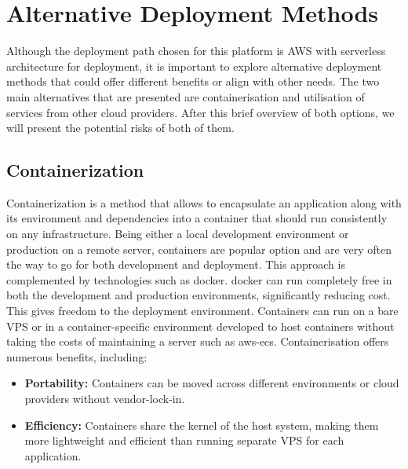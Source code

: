 \section{Alternative Deployment Methods}
\label{sec:alternative-deployment-methods}

Although the deployment path chosen for this platform is \ac{AWS} with serverless architecture for deployment, it is important to explore alternative deployment methods that could offer different benefits or align with other needs.
The two main alternatives that are presented are containerisation and utilisation of services from other cloud providers.
After this brief overview of both options, we will present the potential risks of both of them.
% 


\subsection{Containerization}
\label{subsec:containerization}
Containerization is a method that allows to encapsulate an application along with its environment and dependencies into a container that should run consistently on any infrastructure. 
Being either a local development environment or production on a remote server, containers are popular option and are very often the way to go for both development and deployment.
This approach is complemented by technologies such as \gls{docker}.
\gls{docker} can run completely free in both the development and production environments, significantly reducing cost.
This gives freedom to the deployment environment. 
Containers can run on a bare \ac{VPS} or in a container-specific environment developed to host containers without taking the costs of maintaining a server such as \gls{aws-ecs}.
 Containerisation offers numerous benefits, including:
 \begin{itemize}
     \item \textbf{Portability:} Containers can be moved across different environments or cloud providers without vendor-lock-in.
     \item \textbf{Efficiency:} Containers share the kernel of the host system, making them more lightweight and efficient than running separate \ac{VPS} for each application.
 \end{itemize}


